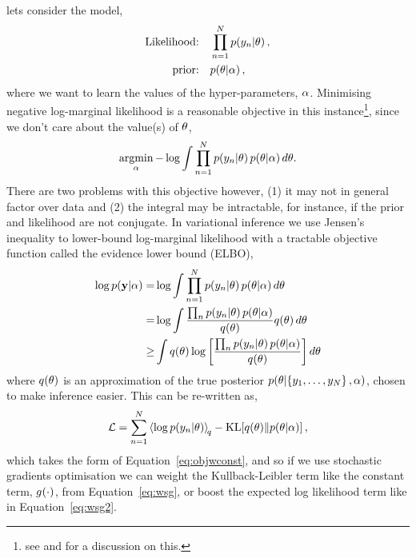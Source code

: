\documentclass[11pt, oneside]{article}
\begin{document}
lets consider the model,
\begin{align}
    \text{Likelihood:} \quad &\prod^N_{n=1} p\!\left({y_n}\middle\vert{\ensuremath{\theta}}\right), \\
    \text{prior:} \quad &p\!\left({\theta}\middle\vert{\ensuremath{\alpha}}\right),
\end{align}
where we want to learn the values of the hyper-parameters, $\alpha$. Minimising
negative log-marginal likelihood is a reasonable objective in this
instance\footnote{see \citet[Chapter 3.4]{bishop2006pattern} and \citet[Chapter
    5]{Rasmussen2006} for a discussion on this.}, since we don't care about the
value(s) of $\theta$,
\begin{equation}
    \argmin_\hyper - \log \int \prod^N_{n=1} \probC{\targs_n}{\param}
    \probC{\param}{\hyper} d \param.
    \label{eq:lml}
\end{equation}
There are two problems with this objective however, (1) it may not in general factor over
data and (2) the integral may be intractable, for instance, if the prior and
likelihood are not conjugate. In variational inference we use Jensen's
inequality to lower-bound log-marginal likelihood with a tractable objective
function called the evidence lower bound (ELBO),
\begin{align}
    \log \probC{\targ}{\hyper} =& \log \int 
        \prod^N_{n=1} \probC{\targs_n}{\param} 
        \probC{\param}{\hyper} d \param \nonumber \\
        =& \log \int 
        \frac{\prod_n \probC{\targs_n}{\param} \probC{\param}{\hyper}}
        {\qrob{\param}} \qrob{\param} d \param \nonumber \\
        \geq& \int \qrob{\param} \log \sbrac{%
            \frac{\prod_n \probC{\targs_n}{\param} 
            \probC{\param}{\hyper}}{\qrob{\param}}}
        d \param
\end{align}
where $q\!\left({\theta}\right)$ is an approximation of the true posterior
$p\!\left({\theta}\middle\vert{\ensuremath{\left\{{y_1, \ldots, y_N}\right\}}, \ensuremath{\alpha}}\right)$, chosen to make 
inference easier. This can be re-written as,
\begin{equation}
    \elbo = \sum^N_{n=1} \expec{q}{\log\probC{\targs_n}{\param}} -
    \KL{\qrob{\param}}{\probC{\param}{\hyper}},
    \label{eq:elbo}
\end{equation}
which takes the form of Equation~\eqref{eq:objwconst}, and so if we use
stochastic gradients optimisation we can weight the Kullback-Leibler term like
the constant term, ${g}_{}\!\left({{\cdot}}\right)$, from Equation~\eqref{eq:wsg}, or boost
the expected log likelihood term like in Equation~\eqref{eq:wsg2}.
\end{document}
